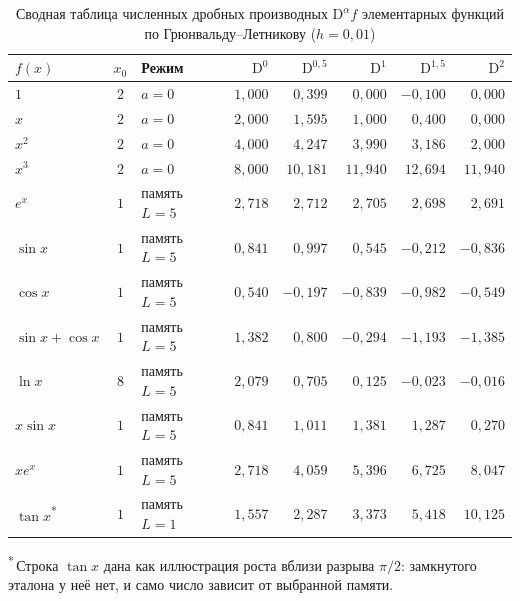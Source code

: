 \documentclass[14pt,a4paper]{extarticle}
\newcommand{\D}{\mathrm{D}}
\begin{document}
\begin{table}[htbp]
\centering
\caption{Сводная таблица численных дробных производных $\D^{\alpha}f$ элементарных функций по Грюнвальду--Летникову ($h=0{,}01$)}
\label{tab:master}
\small
\begin{tabular}{|l|c|l|r|r|r|r|r|}
\hline
$f(x)$ & $x_0$ & Режим & $\D^{0}$ & $\D^{0{,}5}$ & $\D^{1}$ & $\D^{1{,}5}$ & $\D^{2}$ \\
\hline
$1$            & $2$ & $a=0$        & $1{,}000$ & $0{,}399$  & $0{,}000$  & $-0{,}100$ & $0{,}000$ \\
\hline
$x$            & $2$ & $a=0$        & $2{,}000$ & $1{,}595$  & $1{,}000$  & $0{,}400$  & $0{,}000$ \\
\hline
$x^2$          & $2$ & $a=0$        & $4{,}000$ & $4{,}247$  & $3{,}990$  & $3{,}186$  & $2{,}000$ \\
\hline
$x^3$          & $2$ & $a=0$        & $8{,}000$ & $10{,}181$ & $11{,}940$ & $12{,}694$ & $11{,}940$ \\
\hline
$e^{x}$        & $1$ & память $L=5$  & $2{,}718$ & $2{,}712$  & $2{,}705$  & $2{,}698$  & $2{,}691$ \\
\hline
$\sin x$       & $1$ & память $L=5$  & $0{,}841$ & $0{,}997$  & $0{,}545$  & $-0{,}212$ & $-0{,}836$ \\
\hline
$\cos x$       & $1$ & память $L=5$  & $0{,}540$ & $-0{,}197$ & $-0{,}839$ & $-0{,}982$ & $-0{,}549$ \\
\hline
$\sin x+\cos x$& $1$ & память $L=5$  & $1{,}382$ & $0{,}800$  & $-0{,}294$ & $-1{,}193$ & $-1{,}385$ \\
\hline
$\ln x$        & $8$ & память $L=5$  & $2{,}079$ & $0{,}705$  & $0{,}125$  & $-0{,}023$ & $-0{,}016$ \\
\hline
$x\sin x$      & $1$ & память $L=5$  & $0{,}841$ & $1{,}011$  & $1{,}381$  & $1{,}287$  & $0{,}270$ \\
\hline
$xe^{x}$       & $1$ & память $L=5$  & $2{,}718$ & $4{,}059$  & $5{,}396$  & $6{,}725$  & $8{,}047$ \\
\hline
$\tan x$\textsuperscript{*} & $1$ & память $L=1$  & $1{,}557$ & $2{,}287$  & $3{,}373$  & $5{,}418$  & $10{,}125$ \\
\hline
\end{tabular}

\vspace{2pt}
{\footnotesize\raggedright\textsuperscript{*}\,Строка $\tan x$ дана как иллюстрация роста вблизи разрыва $\pi/2$: замкнутого эталона у неё нет, и само число зависит от выбранной памяти.\par}
\end{table}
\end{document}
